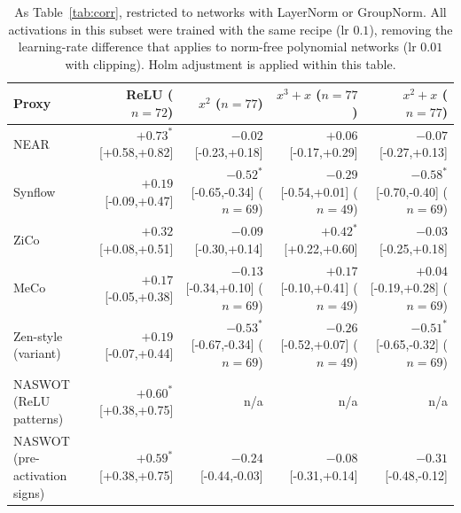 \begin{table}[h]
\centering
\caption{As Table~\ref{tab:corr}, restricted to networks with LayerNorm or GroupNorm.  All activations in this subset were trained with the same
  recipe (lr $0.1$), removing the learning-rate difference that applies to norm-free polynomial networks (lr $0.01$ with clipping).
  Holm adjustment is applied within this table.}
\label{tab:corrsame}
\small
\begin{tabular}{lrrrr}
\toprule
\textbf{Proxy} & \textbf{ReLU} ($n{=}72$) & \textbf{$x^2$} ($n{=}77$) & \textbf{$x^3{+}x$} ($n{=}77$) & \textbf{$x^2{+}x$} ($n{=}77$) \\
\midrule
NEAR & $+0.73^{*}$ {\scriptsize[+0.58,+0.82]} & $-0.02$ {\scriptsize[-0.23,+0.18]} & $+0.06$ {\scriptsize[-0.17,+0.29]} & $-0.07$ {\scriptsize[-0.27,+0.13]} \\
Synflow & $+0.19$ {\scriptsize[-0.09,+0.47]} & $-0.52^{*}$ {\scriptsize[-0.65,-0.34]} {\scriptsize($n{=}69$)} & $-0.29$ {\scriptsize[-0.54,+0.01]} {\scriptsize($n{=}49$)} & $-0.58^{*}$ {\scriptsize[-0.70,-0.40]} {\scriptsize($n{=}69$)} \\
ZiCo & $+0.32$ {\scriptsize[+0.08,+0.51]} & $-0.09$ {\scriptsize[-0.30,+0.14]} & $+0.42^{*}$ {\scriptsize[+0.22,+0.60]} & $-0.03$ {\scriptsize[-0.25,+0.18]} \\
MeCo & $+0.17$ {\scriptsize[-0.05,+0.38]} & $-0.13$ {\scriptsize[-0.34,+0.10]} {\scriptsize($n{=}69$)} & $+0.17$ {\scriptsize[-0.10,+0.41]} {\scriptsize($n{=}49$)} & $+0.04$ {\scriptsize[-0.19,+0.28]} {\scriptsize($n{=}69$)} \\
Zen-style (variant) & $+0.19$ {\scriptsize[-0.07,+0.44]} & $-0.53^{*}$ {\scriptsize[-0.67,-0.34]} {\scriptsize($n{=}69$)} & $-0.26$ {\scriptsize[-0.52,+0.07]} {\scriptsize($n{=}49$)} & $-0.51^{*}$ {\scriptsize[-0.65,-0.32]} {\scriptsize($n{=}69$)} \\
NASWOT (ReLU patterns) & $+0.60^{*}$ {\scriptsize[+0.38,+0.75]} & n/a & n/a & n/a \\
NASWOT (pre-activation signs) & $+0.59^{*}$ {\scriptsize[+0.38,+0.75]} & $-0.24$ {\scriptsize[-0.44,-0.03]} & $-0.08$ {\scriptsize[-0.31,+0.14]} & $-0.31$ {\scriptsize[-0.48,-0.12]} \\
\bottomrule
\end{tabular}
\end{table}
